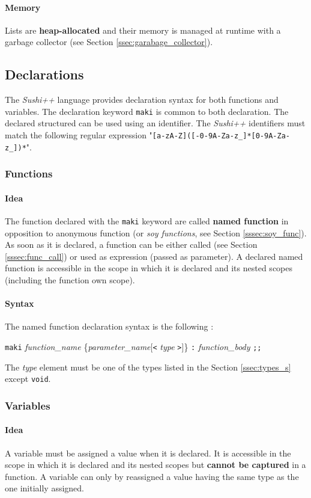 \documentclass[a4paper,11pt]{article}
\begin{document}
\paragraph{Memory} Lists are \textbf{heap-allocated} and their memory is managed at runtime with a garbage collector (see Section \ref{ssec:garabage_collector}).

\subsection{Declarations}

The \textit{Sushi++} language provides declaration syntax for both functions and variables. The declaration keyword \texttt{maki} is common to both declaration. The declared structured can be used using an identifier. The \textit{Sushi++} identifiers must match the following regular expression "\texttt{{[a-zA-Z]}({[-0-9A-Za-z\_]}*{[0-9A-Za-z\_]})*}".
\subsubsection{Functions}
\label{sssec:decl_func}
\paragraph{Idea} The function declared with the \texttt{maki} keyword are called \textbf{named function} in opposition to anonymous function (or \textit{soy functions}, see Section \ref{sssec:soy_func}). As soon as it is declared, a function can be either called (see Section \ref{sssec:func_call}) or used as expression (passed as parameter). A declared named function is accessible in the scope in which it is declared and its nested scopes (including the function own scope).
\paragraph{Syntax}  The named function declaration syntax is the following :
\begin{center}
\texttt{maki} \textit{function\_name} \{\textit{parameter\_name}[\texttt{<} \textit{type} \texttt{>}]\} \texttt{:} \textit{function\_body} \texttt{;;}
\end{center}
The \textit{type} element must be one of the types listed in the Section \ref{ssec:types_s} except \texttt{void}.
\subsubsection{Variables}
\paragraph{Idea} A variable must be assigned a value when it is declared. It is accessible in the scope in which it is declared and its nested scopes but \textbf{cannot be captured} in a function. A variable can only by reassigned a value having the same type as the one initially assigned.
\end{document}
